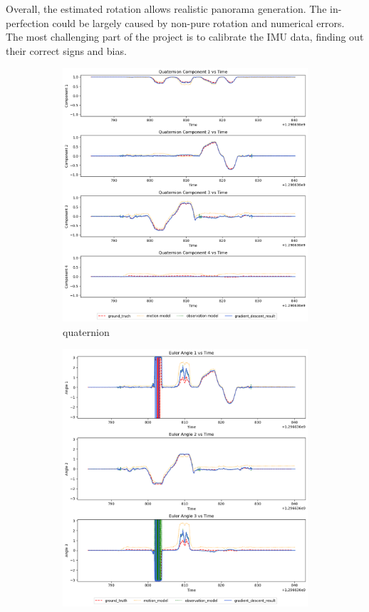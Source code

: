 \documentclass[conference]{IEEEtran}
\begin{document}
Overall, the estimated rotation allows realistic panorama generation.
The in-perfection could be largely caused by non-pure rotation 
and numerical errors.
The most challenging part of the project is to calibrate the 
IMU data, finding out their correct signs and bias.

\begin{figure}[h]
    \centering
    \begin{subfigure}{0.4\textwidth}
        \includegraphics[width=\linewidth]{../img/1_qt.png}
        \caption{quaternion}
        \label{fig:1qt}
    \end{subfigure}
    \hfill
    \begin{subfigure}{0.4\textwidth}
        \includegraphics[width=\linewidth]{../img/1_ea.png}

\end{subfigure}
\end{figure}
\end{document}
